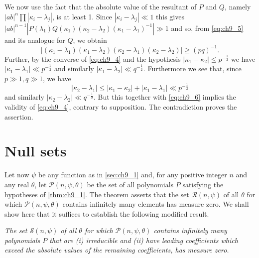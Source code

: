 We now use the fact that the absolute value of the resultant of $P$ and $Q$, namely $|ab|^n \prod |\kappa_i - \lambda_j|$, is at least 1. Since $|\kappa_i - \lambda_j| \ll 1$ this gives $|ab|^{n-1} |P(\lambda_1) Q(\kappa_1) (\kappa_2 - \lambda_2) (\kappa_1 - \lambda_1)^{-1}| \gg 1$ and so, from \eqref{eq:ch9_5} and its analogue for $Q$, we obtain
\[\left| (\kappa_1 - \lambda_1) (\kappa_1 - \lambda_2) (\kappa_2 - \lambda_1) (\kappa_2 - \lambda_2) \right| \geqslant (pq)^{-1}. \tag{6}\label{eq:ch9_6}\]
Further, by the converse of \eqref{eq:ch9_4} and the hypothesis $|\kappa_1 - \kappa_2| \leq p^{-\frac{1}{2}}$ we have $|\kappa_1 - \lambda_1| \ll p^{-\frac{1}{2}}$ and similarly $|\kappa_1 - \lambda_2| \ll q^{-\frac{1}{2}}$. Furthermore we see that, since $p \gg 1, q \gg 1$, we have
\[|\kappa_2 - \lambda_1| \leq |\kappa_1 - \kappa_2| + |\kappa_1 - \lambda_1| \ll p^{-\frac{1}{2}}\]
and similarly $|\kappa_2 - \lambda_2| \ll q^{-\frac{1}{2}}$. But this together with \eqref{eq:ch9_6} implies the validity of \eqref{eq:ch9_4}, contrary to supposition. The contradiction proves the assertion.

\section{Null sets}\label{sec:ch9_3}

Let now $\psi$ be any function as in \autoref{sec:ch9_1} and, 
for any positive integer $n$ and any real $\theta$, let $\mathscr{P}(n, \psi, \theta)$ be the set of all polynomials $P$ satisfying the hypotheses of \autoref{thm:ch9_1}. The theorem asserts that the set $\mathscr{R}(n, \psi)$ of all $\theta$ for which $\mathscr{P}(n, \psi, \theta)$ contains infinitely many elements has measure zero. We shall show here that it suffices to establish the following modified result.

\emph{The set $\mathscr{S}(n, \psi)$ of all $\theta$ for which $\mathscr{P}(n, \psi, \theta)$ contains infinitely many polynomials $P$ that are (i) irreducible and (ii) have leading coefficients which exceed the absolute values of the remaining coefficients, has measure zero.}


